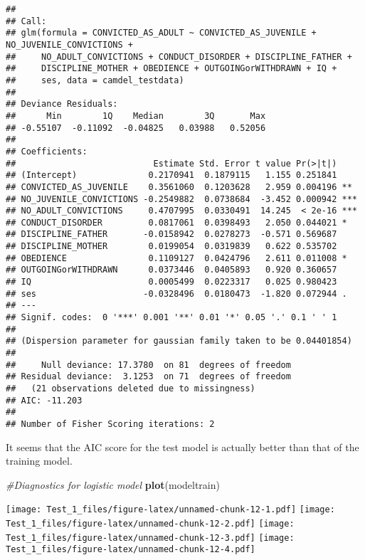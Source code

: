 \documentclass[]{article}
\newenvironment{Shaded}{\begin{snugshade}}{\end{snugshade}}
\newcommand{\KeywordTok}[1]{\textcolor[rgb]{0.13,0.29,0.53}{\textbf{#1}}}
\newcommand{\CommentTok}[1]{\textcolor[rgb]{0.56,0.35,0.01}{\textit{#1}}}
\newcommand{\NormalTok}[1]{#1}
\begin{document}
\begin{verbatim}
## 
## Call:
## glm(formula = CONVICTED_AS_ADULT ~ CONVICTED_AS_JUVENILE + NO_JUVENILE_CONVICTIONS + 
##     NO_ADULT_CONVICTIONS + CONDUCT_DISORDER + DISCIPLINE_FATHER + 
##     DISCIPLINE_MOTHER + OBEDIENCE + OUTGOINGorWITHDRAWN + IQ + 
##     ses, data = camdel_testdata)
## 
## Deviance Residuals: 
##      Min        1Q    Median        3Q       Max  
## -0.55107  -0.11092  -0.04825   0.03988   0.52056  
## 
## Coefficients:
##                           Estimate Std. Error t value Pr(>|t|)    
## (Intercept)              0.2170941  0.1879115   1.155 0.251841    
## CONVICTED_AS_JUVENILE    0.3561060  0.1203628   2.959 0.004196 ** 
## NO_JUVENILE_CONVICTIONS -0.2549882  0.0738684  -3.452 0.000942 ***
## NO_ADULT_CONVICTIONS     0.4707995  0.0330491  14.245  < 2e-16 ***
## CONDUCT_DISORDER         0.0817061  0.0398493   2.050 0.044021 *  
## DISCIPLINE_FATHER       -0.0158942  0.0278273  -0.571 0.569687    
## DISCIPLINE_MOTHER        0.0199054  0.0319839   0.622 0.535702    
## OBEDIENCE                0.1109127  0.0424796   2.611 0.011008 *  
## OUTGOINGorWITHDRAWN      0.0373446  0.0405893   0.920 0.360657    
## IQ                       0.0005499  0.0223317   0.025 0.980423    
## ses                     -0.0328496  0.0180473  -1.820 0.072944 .  
## ---
## Signif. codes:  0 '***' 0.001 '**' 0.01 '*' 0.05 '.' 0.1 ' ' 1
## 
## (Dispersion parameter for gaussian family taken to be 0.04401854)
## 
##     Null deviance: 17.3780  on 81  degrees of freedom
## Residual deviance:  3.1253  on 71  degrees of freedom
##   (21 observations deleted due to missingness)
## AIC: -11.203
## 
## Number of Fisher Scoring iterations: 2
\end{verbatim}

It seems that the AIC score for the test model is actually better than
that of the training model.

\begin{Shaded}
\begin{Highlighting}[]
\CommentTok{#Diagnostics for logistic model}
\KeywordTok{plot}\NormalTok{(modeltrain)}
\end{Highlighting}
\end{Shaded}

\texttt{[image: Test\_1\_files/figure-latex/unnamed-chunk-12-1.pdf]}
\texttt{[image: Test\_1\_files/figure-latex/unnamed-chunk-12-2.pdf]}
\texttt{[image: Test\_1\_files/figure-latex/unnamed-chunk-12-3.pdf]}
\texttt{[image: Test\_1\_files/figure-latex/unnamed-chunk-12-4.pdf]}
\end{document}
